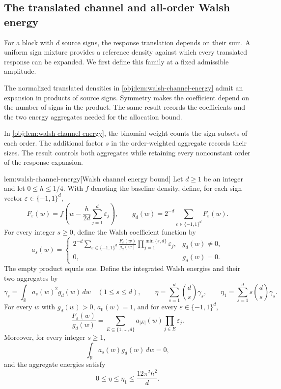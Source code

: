\documentclass[11pt]{article}
\begin{document}
\subsection{The translated channel and all-order Walsh energy}

For a block with \(d\) source signs, the response translation depends on their sum. A uniform sign mixture provides a reference density against which every translated response can be expanded. We first define this family at a fixed admissible amplitude.



The normalized translated densities in \cref{obj:lem:walsh-channel-energy} admit an expansion in products of source signs. Symmetry makes the coefficient depend on the number of signs in the product. The same result records the coefficients and the two energy aggregates needed for the allocation bound.



In \cref{obj:lem:walsh-channel-energy}, the binomial weight counts the sign subsets of each order. The additional factor \(s\) in the order-weighted aggregate records their sizes. The result controls both aggregates while retaining every nonconstant order of the response expansion.

\begin{lemmav}{lem:walsh-channel-energy}[Walsh channel energy bound]
Let \(d\ge1\) be an integer and let \(0\le h\le1/4\). With \(f\) denoting the baseline density, define, for each sign vector \(\varepsilon\in\{-1,1\}^d\),
\[
F_\varepsilon(w)
=f\!\left(w-\frac{h}{2d}\sum_{j=1}^d\varepsilon_j\right),
\qquad
g_d(w)=2^{-d}\sum_{\varepsilon\in\{-1,1\}^d}F_\varepsilon(w).
\]
For every integer \(s\ge0\), define the Walsh coefficient function by
\[
a_s(w)=
\begin{cases}
2^{-d}\displaystyle\sum_{\varepsilon\in\{-1,1\}^d}
\frac{F_\varepsilon(w)}{g_d(w)}
\displaystyle\prod_{j=1}^{\min\{s,d\}}\varepsilon_j,
& g_d(w)\ne0,\\
0,&g_d(w)=0.
\end{cases}
\]
The empty product equals one. Define the integrated Walsh energies and their two aggregates by
\[
\gamma_s=\int_{\mathbb R}a_s(w)^2g_d(w)\,dw
\quad(1\le s\le d),
\qquad
\eta=\sum_{s=1}^d\binom ds\gamma_s,
\qquad
\eta_1=\sum_{s=1}^d s\binom ds\gamma_s.
\]
For every \(w\) with \(g_d(w)>0\), \(a_0(w)=1\), and for every \(\varepsilon\in\{-1,1\}^d\),
\[
\frac{F_\varepsilon(w)}{g_d(w)}
=
\sum_{E\subseteq\{1,\ldots,d\}}
a_{|E|}(w)\prod_{j\in E}\varepsilon_j.
\]
Moreover, for every integer \(s\ge1\),
\[
\int_{\mathbb R}a_s(w)g_d(w)\,dw=0,
\]
and the aggregate energies satisfy
\[
0\le\eta\le\eta_1\le\frac{12\pi^2h^2}{d}.
\]
\end{lemmav}
\end{document}

